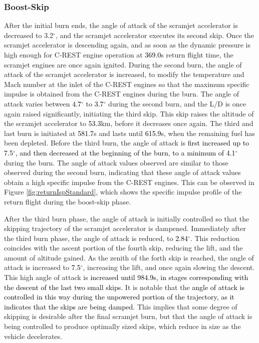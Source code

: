 \subsubsection{ Boost-Skip}\label{sec:boost}

After the initial burn ends, the angle of attack of the scramjet accelerator is decreased to 3.2$^\circ$, and the scramjet accelerator executes its second skip. Once the scramjet accelerator is descending again, and as soon as the dynamic pressure is high enough for C-REST engine operation at \textcolor{black}{369.0}s return flight time, the scramjet engines are once again ignited.
During the second burn, the angle of attack of the scramjet accelerator is increased, to modify the temperature and Mach number at the inlet of the C-REST engines so that the maximum specific impulse is obtained from the C-REST engines during the burn. 
The angle of attack varies between \textcolor{black}{4.7}$^\circ$ to \textcolor{black}{3.7}$^\circ$ during the second burn, and the L/D is once again raised significantly, initiating the third skip. 
This skip raises the altitude of the scramjet accelerator to \textcolor{black}{53.3}km, before it decreases once again. 
The third and last burn is initiated at \textcolor{black}{581.7}s and lasts until \textcolor{black}{615.9}s, when the remaining fuel has been depleted. Before the third burn, the angle of attack is \textcolor{black}{first increased up to 7.5$^\circ$, and then decreased at the beginning of the burn, to a minimum of 4.1}$^\circ$ during the burn. The angle of attack values observed are similar to those observed during the second burn, indicating that these angle of attack values obtain a high specific impulse from the C-REST engines. This can be observed in Figure \ref{fig:returnIspStandard}, which shows the specific impulse profile of the return flight during the boost-skip phase. 

After the third burn phase, the angle of attack is initially controlled so that the skipping trajectory of the scramjet accelerator is dampened.
Immediately after the third burn phase, the angle of attack is reduced, to \textcolor{black}{2.84}$^\circ$. This reduction coincides with the ascent portion of the fourth skip, reducing the lift, and the amount of altitude gained. 
As the zenith of the forth skip is reached, the angle of attack is increased to \textcolor{black}{7.5}$^\circ$, increasing the lift, and once again slowing the descent. 
This high angle of attack is \textcolor{black}{increased until 984.9s, in stages corresponding with the descent of the last two small skips}.
It is notable that the \textcolor{black}{angle of attack is controlled in this way during the unpowered portion of the trajectory, as it indicates that the skips are being damped.} This implies that some degree of skipping is desirable after the final scramjet burn, but that the angle of attack is being controlled to produce optimally sized skips, which reduce in size as the vehicle decelerates. 

